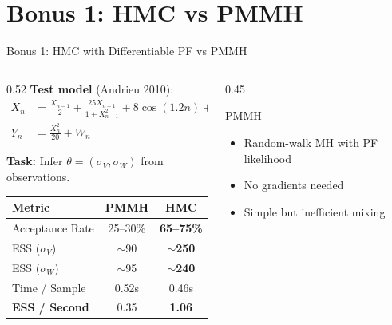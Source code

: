 \documentclass[aspectratio=169,10pt]{beamer}
\newcommand{\highlight}[1]{\textcolor{jpmlightblue}{\textbf{#1}}}
\begin{document}
\section{Bonus 1: HMC vs PMMH}

\begin{frame}{Bonus 1: HMC with Differentiable PF vs PMMH}
\begin{columns}[T]
\begin{column}{0.52\textwidth}
\textbf{Test model} (Andrieu 2010):
\vspace{-0.3em}
\begin{align}
  X_n &= \frac{X_{n-1}}{2} + \frac{25X_{n-1}}{1+X_{n-1}^2} + 8\cos(1.2n) + V_n \\
  Y_n &= \frac{X_n^2}{20} + W_n
\end{align}

\textbf{Task:} Infer $\theta = (\sigma_V, \sigma_W)$ from observations.

\vspace{0.5em}
\begin{table}
\centering
\scriptsize
\begin{tabular}{@{}lcc@{}}
  \toprule
  \textbf{Metric} & \textbf{PMMH} & \textbf{HMC} \\
  \midrule
  Acceptance Rate & 25--30\% & \textbf{65--75\%} \\
  ESS ($\sigma_V$) & $\sim$90 & $\sim$\textbf{250} \\
  ESS ($\sigma_W$) & $\sim$95 & $\sim$\textbf{240} \\
  Time / Sample & 0.52s & 0.46s \\
  \highlight{ESS / Second} & 0.35 & \textbf{1.06} \\
  \bottomrule
\end{tabular}
\end{table}
\end{column}
\begin{column}{0.45\textwidth}
\vspace{1em}
\begin{block}{PMMH}
\begin{itemize}
  \item Random-walk MH with PF likelihood
  \item No gradients needed
  \item Simple but inefficient mixing
\end{itemize}
\end{block}


\end{column}
\end{columns}
\end{frame}
\end{document}
